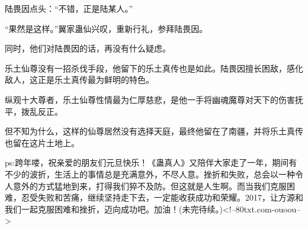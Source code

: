 \begin{this_body}
陆畏因点头：“不错，正是陆某人。”

“果然是这样。”翼家蛊仙兴叹，重新行礼，参拜陆畏因。

同时，他们对陆畏因的话，再没有什么疑虑。

乐土仙尊没有一招杀伐手段，他留下的乐土真传也是如此。陆畏因擅长困敌，感化敌人，这正是乐土真传最为鲜明的特色。

纵观十大尊者，乐土仙尊性情最为仁厚慈悲，是他一手将幽魂魔尊对天下的伤害抚平，拨乱反正。

但不知为什么，这样的仙尊居然没有选择天庭，最终他留在了南疆，并将乐土真传也留在这片土地上。

ps:跨年喽，祝亲爱的朋友们元旦快乐！《蛊真人》又陪伴大家走了一年，期间有不少的波折，生活上的事情总是充满意外，不尽人意。挫折和失败，总会以一种令人意外的方式猛地到来，打得我们猝不及防。但这就是人生啊。而当我们克服困难，忍受失败和苦痛，继续坚持走下去，一定能收获成功和荣耀。2017，让方源和我们一起克服困难和挫折，迈向成功吧。加油！(未完待续。)<!--80txt.com-ouoou-->

\end{this_body}

